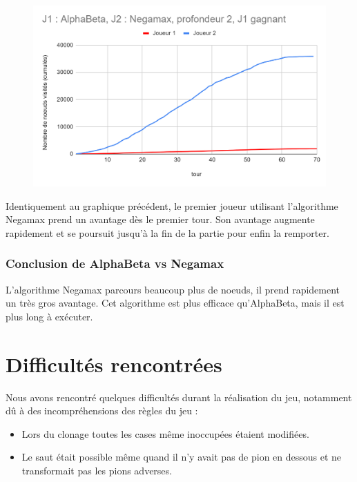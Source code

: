 \documentclass[12pt]{article}
\begin{document}
\begin{figure}[!h]
   \includegraphics[width=\textwidth]{prof2negamaxVSalpha.png}
\end{figure}

Identiquement au graphique précédent, le premier joueur utilisant l'algorithme Negamax prend un avantage dès le premier tour. Son avantage augmente rapidement et se poursuit jusqu'à la fin de la partie pour enfin la remporter.

\subsubsection{Conclusion de AlphaBeta vs Negamax}

L'algorithme Negamax parcours beaucoup plus de noeuds, il prend rapidement un très gros avantage.
Cet algorithme est plus efficace qu'AlphaBeta, mais il est plus long à exécuter.

\newpage
\section{Difficultés rencontrées}

Nous avons rencontré quelques difficultés durant la réalisation du jeu, notamment dû à des incompréhensions des règles du jeu :\\

\begin{itemize}
    \item Lors du clonage toutes les cases même inoccupées étaient modifiées.
    \item Le saut était possible même quand il n'y avait pas de pion en dessous et ne transformait pas les pions adverses.
\end{itemize}
\end{document}
